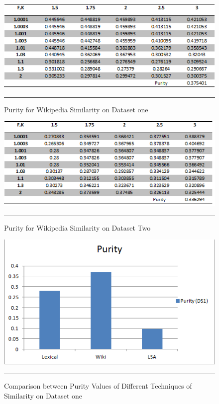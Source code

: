 \begin{figure}[htbp]
	\centering
		\includegraphics{./Figures/wiki_Purity_DS1.png}
		\rule{35em}{0.5pt}
	\caption[Purity for Wikipedia Similarity on Dataset one]{Purity for Wikipedia Similarity on Dataset one}
	\label{fig:F2}
\end{figure}

\begin{figure}[htbp]
	\centering
		\includegraphics{./Figures/wiki_Purity_DS2.png}
		\rule{35em}{0.5pt}
	\caption[Purity for Wikipedia Similarity on Dataset one]{Purity for Wikipedia Similarity on Dataset Two}
	\label{fig:F3}
\end{figure}
\begin{figure}[htbp]
	\centering
		\includegraphics{./Figures/Purity_DS1.png}
		\rule{35em}{0.5pt}
	\caption[Comparison between Purity Values of Different Techniques of Similarity on Dataset one]{Comparison between Purity Values of Different Techniques of Similarity on Dataset one}
	\label{fig:F10}
\end{figure}
